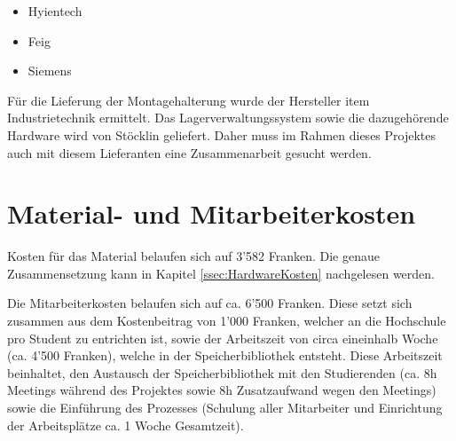 \begin{itemize}
	\item Hyientech
	\item Feig
	\item Siemens
\end{itemize}

\noindent
Für die Lieferung der Montagehalterung wurde der Hersteller item Industrietechnik ermittelt. Das Lagerverwaltungssystem sowie die dazugehörende Hardware wird von Stöcklin geliefert. Daher muss im Rahmen dieses Projektes auch mit diesem Lieferanten eine Zusammenarbeit gesucht werden.

\section{Material- und Mitarbeiterkosten}
\label{sec:MaterialMitarbeiterKosten}
Kosten für das Material belaufen sich auf 3'582 Franken. Die genaue Zusammensetzung kann in Kapitel \ref{ssec:HardwareKosten} nachgelesen werden.

Die Mitarbeiterkosten belaufen sich auf ca. 6'500 Franken. Diese setzt sich zusammen aus dem Kostenbeitrag von 1'000 Franken, welcher an die Hochschule pro Student zu entrichten ist, sowie der Arbeitszeit von circa eineinhalb Woche (ca. 4'500 Franken), welche in der Speicherbibliothek entsteht. Diese Arbeitszeit beinhaltet, den Austausch der Speicherbibliothek mit den Studierenden (ca. 8h Meetings während des Projektes sowie 8h Zusatzaufwand wegen den Meetings) sowie die Einführung des Prozesses (Schulung aller Mitarbeiter und Einrichtung der Arbeitsplätze ca. 1 Woche Gesamtzeit).